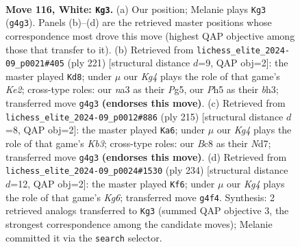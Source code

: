 \documentclass[11pt]{article}
\begin{document}
\clearpage

\begin{figure}[p]\centering
\begin{subfigure}{0.46\textwidth}\centering
\resizebox{\linewidth}{!}{%
\newchessgame
\chessboard[
  setfen={2B5/6k1/8/6PP/6K1/n7/8/8 w - - 1 116},
  showmover=false,
  pgfstyle=straightmove, color=movearrow, markmove={g4-g3}
]}
\caption{}
\end{subfigure}\hfill
\begin{subfigure}{0.46\textwidth}\centering
\resizebox{\linewidth}{!}{%
\newchessgame
\chessboard[
  setfen={8/4k3/5p2/3K2p1/1b6/7B/8/8 b - - 29 111},
  showmover=false,
  pgfstyle=straightmove, color=movearrow, markmove={e7-d8}
]}
\caption{}
\end{subfigure}
\\[4pt]
\begin{subfigure}{0.46\textwidth}\centering
\resizebox{\linewidth}{!}{%
\newchessgame
\chessboard[
  setfen={8/3n4/1kp5/p4N2/8/K7/8/8 b - - 23 108},
  showmover=false,
  pgfstyle=straightmove, color=movearrow, markmove={b6-a6}
]}
\caption{}
\end{subfigure}\hfill
\begin{subfigure}{0.46\textwidth}\centering
\resizebox{\linewidth}{!}{%
\newchessgame
\chessboard[
  setfen={6k1/8/6KP/8/8/8/8/1B6 w - - 1 118},
  showmover=false,
  pgfstyle=straightmove, color=movearrow, markmove={g6-f6}
]}
\caption{}
\end{subfigure}
\caption{\textbf{Move 116, White: \texttt{Kg3}.} (a) Our position; Melanie plays \texttt{Kg3} (\texttt{g4g3}). Panels (b)--(d) are the retrieved master positions whose correspondence most drove this move (highest QAP objective among those that transfer to it). (b) Retrieved from \texttt{lichess\_elite\_2024-09\_p0021\#405} (ply 221) [structural distance $d$=9, QAP obj=2]: the master played \texttt{Kd8}; under $\mu$ our \emph{Kg4} plays the role of that game's \emph{Ke2}; cross-type roles: our \emph{n}a3 as their \emph{P}g5, our \emph{P}h5 as their \emph{b}h3; transferred move \texttt{g4g3} \textbf{(endorses this move)}. (c) Retrieved from \texttt{lichess\_elite\_2024-09\_p0012\#886} (ply 215) [structural distance $d$=8, QAP obj=2]: the master played \texttt{Ka6}; under $\mu$ our \emph{Kg4} plays the role of that game's \emph{Kb3}; cross-type roles: our \emph{B}c8 as their \emph{N}d7; transferred move \texttt{g4g3} \textbf{(endorses this move)}. (d) Retrieved from \texttt{lichess\_elite\_2024-09\_p0024\#1530} (ply 234) [structural distance $d$=12, QAP obj=2]: the master played \texttt{Kf6}; under $\mu$ our \emph{Kg4} plays the role of that game's \emph{Kg6}; transferred move \texttt{g4f4}. Synthesis: 2 retrieved analogs transferred to \texttt{Kg3} (summed QAP objective 3, the strongest correspondence among the candidate moves); Melanie committed it via the \texttt{search} selector.}
\label{fig:thought-m230}
\end{figure}
\end{document}
